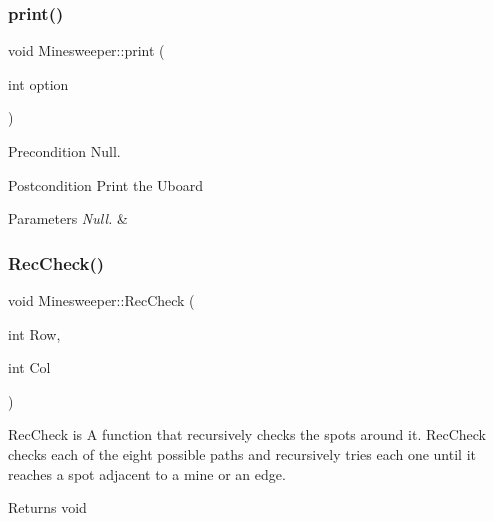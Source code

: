 \subsubsection{\texorpdfstring{print()}{print()}}
{\footnotesize\ttfamily void Minesweeper\+::print (\begin{DoxyParamCaption}\item[{int}]{option }\end{DoxyParamCaption})}

\begin{DoxyPrecond}{Precondition}
Null. 
\end{DoxyPrecond}
\begin{DoxyPostcond}{Postcondition}
Print the Uboard 
\end{DoxyPostcond}

\begin{DoxyParams}{Parameters}
{\em Null.} & \\
\hline
\end{DoxyParams}
\mbox{\label{classMinesweeper_ac86d9717b1312d79e6cd9d56e258a7e6}} 
\subsubsection{\texorpdfstring{Rec\+Check()}{RecCheck()}}
{\footnotesize\ttfamily void Minesweeper\+::\+Rec\+Check (\begin{DoxyParamCaption}\item[{int}]{Row,  }\item[{int}]{Col }\end{DoxyParamCaption})\hspace{0.3cm}{\ttfamily [private]}}



Rec\+Check is A function that recursively checks the spots around it. Rec\+Check checks each of the eight possible paths and recursively tries each one until it reaches a spot adjacent to a mine or an edge. 

\begin{DoxyReturn}{Returns}
void 
\end{DoxyReturn}

